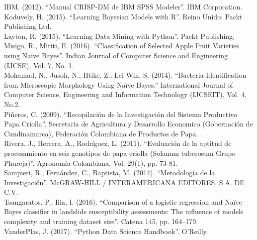 \noindent
IBM. (2012). "`Manual CRISP-DM de IBM SPSS Modeler"'. IBM Corporation.\\

\noindent
Koduvely, H. (2015). "`Learning Bayesian Models with R"'. Reino Unido: Packt Publishing Ltd.\\

\noindent
Layton, R. (2015). "`Learning Data Mining with Python"'. Packt Publishing.\\

\noindent
Misigo, R., Miriti, E. (2016). "`Classification of Selected Apple Fruit Varieties using Naive Bayes"'. Indian Journal of Computer Science and Engineering (IJCSE), Vol. 7, No. 1.\\

\noindent
Mohamad, N., Jusoh, N., Htike, Z., Lei Win, S. (2014). "`Bacteria Identification from Microscopic Morphology Using Naïve Bayes."' International Journal of Computer Science, Engineering and Information Technology (IJCSEIT), Vol. 4, No.2.\\

\noindent 
Piñeros, C. (2009). "`Recopilación de la Investigación del Sistema Productivo Papa Criolla"'. Secretaria de Agricultura y Desarrollo Economico (Gobernación de Cundinamarca), Federación Colombiana de Productos de Papa.\\

\noindent
Rivera, J., Herrera, A., Rodríguez, L. (2011). "`Evaluación de la aptitud de procesamiento en seis genotipos de papa criolla (Solanum tuberosum Grupo Phureja)"'. Agronomía Colombiana, Vol. 29(1), pp. 73-81.\\

\noindent
Sampieri, R., Fernández, C., Baptista, M. (2014). "`Metodología de la Investigación"'. McGRAW-HILL / INTERAMERICANA EDITORES, S.A. DE C.V.\\

\noindent
Tsangaratos, P., Ilia, I. (2016). "`Comparison of a logistic regression and Naïve Bayes classifier in landslide susceptibility assessments: The influence of models complexity and training dataset size"'. Catena 145, pp. 164–179.\\

\noindent
VanderPlas, J. (2017). "`Python Data Science Handbook"'. O’Reilly.\\


\noindent

